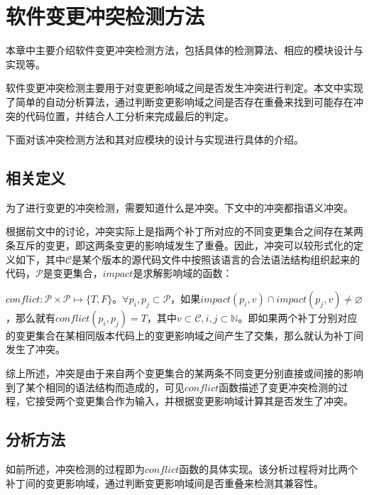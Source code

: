 \chapter{软件变更冲突检测方法}
\label {chap_conflict}

本章中主要介绍软件变更冲突检测方法，包括具体的检测算法、相应的模块设计与实现等。

软件变更冲突检测主要用于对变更影响域之间是否发生冲突进行判定。本文中实现了简单的自动分析算法，通过判断变更影响域之间是否存在重叠来找到可能存在冲突的代码位置，并结合人工分析来完成最后的判定。

下面对该冲突检测方法和其对应模块的设计与实现进行具体的介绍。

\section{相关定义}

\label {conflict_define}

为了进行变更的冲突检测，需要知道什么是冲突。下文中的冲突都指语义冲突。

根据前文中的讨论，冲突实际上是指两个补丁所对应的不同变更集合之间存在某两条互斥的变更，即这两条变更的影响域发生了重叠。因此，冲突可以较形式化的定义如下，其中$\mathcal{C}$是某个版本的源代码文件中按照该语言的合法语法结构组织起来的代码，$\mathcal{P}$是变更集合，$impact$是求解影响域的函数：

\begin{definition}
	$conflict:\mathcal{P} \times \mathcal{P} \mapsto \{T,F\}$。$\forall p_i,p_j \subset \mathcal{P}$，如果$impact(p_i,v) \cap impact(p_j,v) \neq \varnothing$，那么就有$conflict(p_i,p_j) = T$，其中$v \subset \mathcal{C},i,j \subset \mathbb{N}$。即如果两个补丁分别对应的变更集合在某相同版本代码上的变更影响域之间产生了交集，那么就认为补丁间发生了冲突。
\end{definition}

综上所述，冲突是由于来自两个变更集合的某两条不同变更分别直接或间接的影响到了某个相同的语法结构而造成的，可见$conflict$函数描述了变更冲突检测的过程，它接受两个变更集合作为输入，并根据变更影响域计算其是否发生了冲突。

\section{分析方法}
\label {chap_conflict}

如前所述，冲突检测的过程即为$conflict$函数的具体实现。该分析过程将对比两个补丁间的变更影响域，通过判断变更影响域间是否重叠来检测其兼容性。

